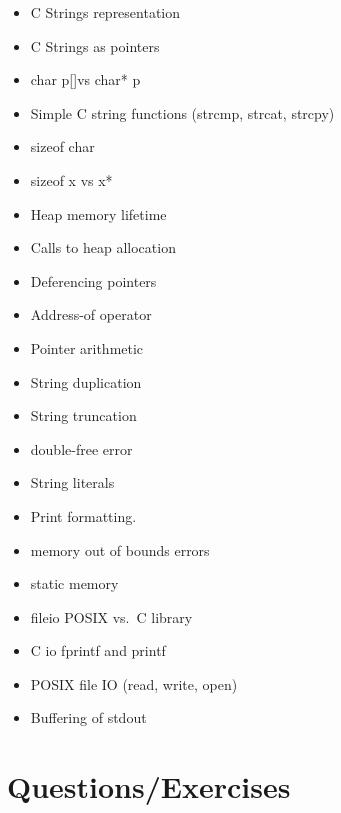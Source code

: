 \begin{itemize}
\tightlist
\item
  C Strings representation
\item
  C Strings as pointers
\item
  char p{[}{]}vs char* p
\item
  Simple C string functions (strcmp, strcat, strcpy)
\item
  sizeof char
\item
  sizeof x vs x*
\item
  Heap memory lifetime
\item
  Calls to heap allocation
\item
  Deferencing pointers
\item
  Address-of operator
\item
  Pointer arithmetic
\item
  String duplication
\item
  String truncation
\item
  double-free error
\item
  String literals
\item
  Print formatting.
\item
  memory out of bounds errors
\item
  static memory
\item
  fileio POSIX vs.~C library
\item
  C io fprintf and printf
\item
  POSIX file IO (read, write, open)
\item
  Buffering of stdout
\end{itemize}

\section{Questions/Exercises}

